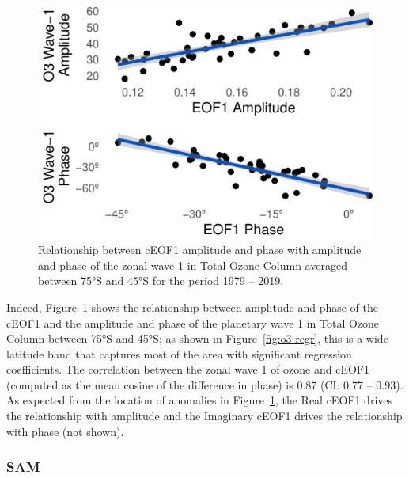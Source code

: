 \documentclass[smallextended]{svjour3}       %
\begin{document}
\begin{figure}
\centering
\includegraphics{../figures/wave1-o3-1.pdf}
\caption{\label{fig:wave1-o3}Relationship between cEOF1 amplitude and phase with amplitude and phase of the zonal wave 1 in Total Ozone Column averaged between 75°S and 45°S for the period 1979 -- 2019.}
\end{figure}

Indeed, Figure~\ref{fig:wave1-o3} shows the relationship between amplitude and phase of the cEOF1 and the amplitude and phase of the planetary wave 1 in Total Ozone Column between 75°S and 45°S; as shown in Figure~\ref{fig:o3-regr}, this is a wide latitude band that captures most of the area with significant regression coefficients. The correlation between the zonal wave 1 of ozone and cEOF1 (computed as the mean cosine of the difference in phase) is 0.87 (CI: 0.77 -- 0.93). As expected from the location of anomalies in Figure~\ref{fig:wave1-o3}, the Real cEOF1 drives the relationship with amplitude and the Imaginary cEOF1 drives the relationship with phase (not shown).

\hypertarget{sam}{%
\subsubsection{SAM}\label{sam}}
\end{document}
